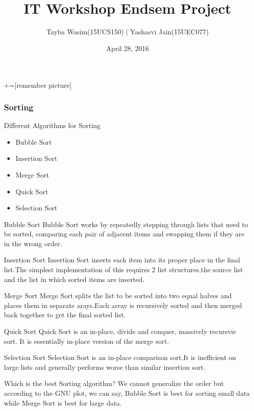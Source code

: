 \documentclass{beamer}
\date{April 28, 2016}
\title[Project]
{
IT Workshop Endsem Project
}
\author[Tayba Wasim, Yashasvi Jain]
{Tayba Wasim(15UCS150) | Yashasvi Jain(15UEC077)}
\institute[institute]
{

The LNMIIT Jaipur \hfill
}
\begin{document}
+=[remember picture]

\begin{frame}
  \titlepage
\end{frame}


\begin{frame}
\frametitle{Sorting}
\begin{block}{Different Algorithms for Sorting}
\begin{itemize}
\item Bubble Sort
\item Insertion Sort
\item Merge Sort
\item Quick Sort
\item Selection Sort
\end{itemize}
\end{block}
\begin{block}{Bubble Sort}
Bubble Sort works by repeatedly stepping through lists that
need to be sorted, comparing each pair of adjacent items
and swapping them if they are in the wrong order.
\end{block}
\end{frame}
\begin{frame}
\begin{block}{Insertion Sort}
Insertion Sort inserts each item into its proper place in the
final list.The simplest implementation of this requires 2
list structures,the source list and the list in which sorted items are inserted.
\end{block}
\begin{block}{Merge Sort}
Merge Sort splits the list to be sorted into two equal halves
and places them in separate arays.Each array is recursively
sorted and then merged back together to get the final sorted
list.
\end{block}
\begin{block}{Quick Sort}
Quick Sort is an in-place, divide and conquer, massively
recursvie sort. It is essentially in-place version of the merge
sort.
\end{block}
\end{frame}
\begin{frame}
\begin{block}{Selection Sort}
Selection Sort is an in-place comparison sort.It is inefficient
on large lists and generally performs worse than similar
insertion sort.
\end{block}
\begin{block}{Which is the best Sorting algorithm?}
We cannot generalize the order but according to the GNU plot, we can say, Bubble Sort is best for sorting small data while Merge Sort is best for large data.
\end{block}
\end{frame}
\end{document}
